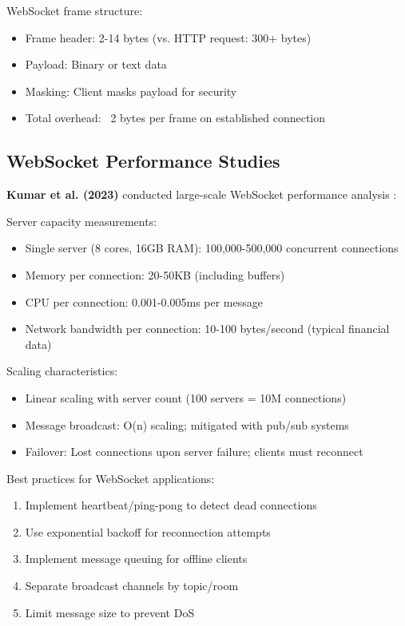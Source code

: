 \documentclass[conference]{IEEEtran}
\begin{document}
WebSocket frame structure:
\begin{itemize}
    \item Frame header: 2-14 bytes (vs. HTTP request: 300+ bytes)
    \item Payload: Binary or text data
    \item Masking: Client masks payload for security
    \item Total overhead: ~2 bytes per frame on established connection
\end{itemize}

\subsection{WebSocket Performance Studies}

\textbf{Kumar et al. (2023)} conducted large-scale WebSocket performance analysis \cite{kumar2023realtime}:

Server capacity measurements:
\begin{itemize}
    \item Single server (8 cores, 16GB RAM): 100,000-500,000 concurrent connections
    \item Memory per connection: 20-50KB (including buffers)
    \item CPU per connection: 0.001-0.005ms per message
    \item Network bandwidth per connection: 10-100 bytes/second (typical financial data)
\end{itemize}

Scaling characteristics:
\begin{itemize}
    \item Linear scaling with server count (100 servers = 10M connections)
    \item Message broadcast: O(n) scaling; mitigated with pub/sub systems
    \item Failover: Lost connections upon server failure; clients must reconnect
\end{itemize}

Best practices for WebSocket applications:
\begin{enumerate}
    \item Implement heartbeat/ping-pong to detect dead connections
    \item Use exponential backoff for reconnection attempts
    \item Implement message queuing for offline clients
    \item Separate broadcast channels by topic/room
    \item Limit message size to prevent DoS
\end{enumerate}
\end{document}
